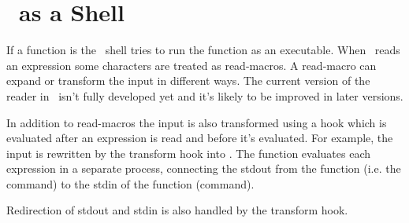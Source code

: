 %
%
%
%
%
\section{\lips\ as a Shell}
If a function is  the \lips\ shell tries to run the
function as an executable.  When \lips\ reads an expression some
characters are treated as read-macros.  A read-macro can expand or
transform the input in different ways.  The current version of the
reader in \lips\ isn't fully developed yet and it's likely to be
improved in later versions.

In addition to read-macros the input is also transformed using a hook
which is evaluated after an expression is read and before it's
evaluated.  For example, the input  is rewritten by
the transform hook into .  The
 function evaluates each expression in a separate
process, connecting the stdout from the  function (i.e. the
 command) to the stdin of the  function (command).

Redirection of stdout and stdin is also handled by the transform hook.
